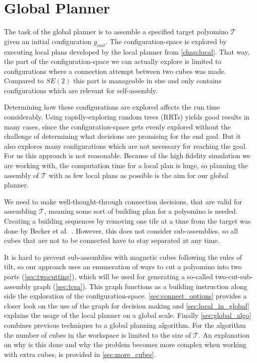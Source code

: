 \chapter{Global Planner}
\label{chap:global}

The task of the global planner is to assemble a specified target polyomino $\mathcal{T}$ given an initial configuration $g_{init}$.
The configuration-space is explored by executing local plans developed by the local planner from \autoref{chap:local}.
That way, the part of the configuration-space we can actually explore is limited to configurations where a connection attempt between two cubes was made.
Compared to $SE(2)$ this part is manageable in size and only contains configurations which are relevant for self-assembly.

Determining how these configurations are explored affects the run time considerably.
Using rapidly-exploring random trees (RRTs) \cite{lavalle1998} yields good results in many cases, since the configuration-space gets evenly explored without the challenge of determining what decisions are promising for the end goal.
But it also explores many configurations which are not necessary for reaching the goal.
For us this approach is not reasonable. 
Because of the high fidelity simulation we are working with, the computation time for a local plan is huge, so planning the assembly of $\mathcal{T}$ with as few local plans as possible is the aim for our global planner.

We need to make well-thought-through connection decisions, that are valid for assembling $\mathcal{T}$, meaning some sort of building plan for a polyomino is needed.
Creating a building sequences by removing one tile at a time from the target was done by Becker et al.\ \cite{Becker2020}.
However, this does not consider sub-assemblies, so all cubes that are not to be connected have to stay separated at any time.

It is hard to prevent sub-assemblies with magnetic cubes following the rules of tilt, so our approach uses an enumeration of ways to cut a polyomino into two parts (\autoref{sec:twocutting}), which will be used for generating a so-called two-cut-sub-assembly graph (\autoref{sec:tcsa}).
This graph functions as a building instruction along side the exploration of the configuration-space.
\autoref{sec:connect_options} provides a closer look on the use of the graph for decision making and \autoref{sec:local_in_global} explains the usage of the local planner on a global scale. 
Finally \autoref{sec:global_algo} combines previous techniques to a global planning algorithm.
For the algorithm the number of cubes in the workspace is limited to the size of $\mathcal{T}$.
An explanation on why is this done and why the problem becomes more complex when working with extra cubes, is provided in \autoref{sec:more_cubes}.


